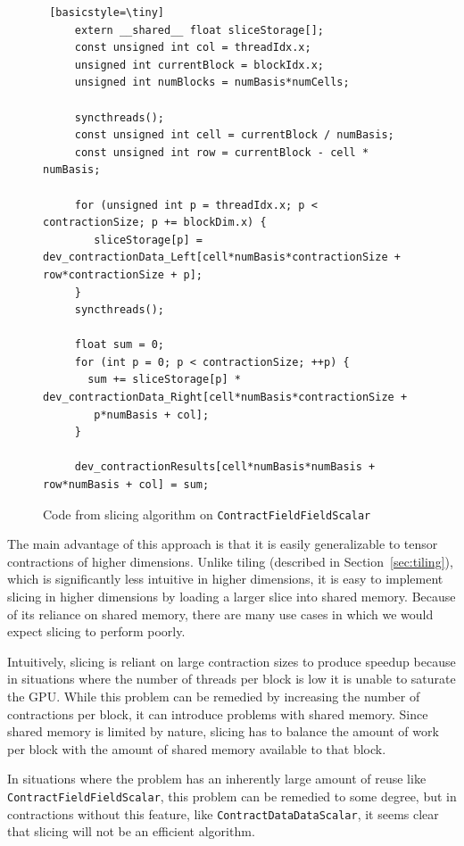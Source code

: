 \begin{figure}[ht]
    \begin{lstlisting} [basicstyle=\tiny]
     extern __shared__ float sliceStorage[];
     const unsigned int col = threadIdx.x;
     unsigned int currentBlock = blockIdx.x;
     unsigned int numBlocks = numBasis*numCells;
     
     syncthreads();
     const unsigned int cell = currentBlock / numBasis;
     const unsigned int row = currentBlock - cell * numBasis;

     for (unsigned int p = threadIdx.x; p < contractionSize; p += blockDim.x) {
        sliceStorage[p] = dev_contractionData_Left[cell*numBasis*contractionSize + row*contractionSize + p];
     }
     syncthreads();

     float sum = 0;
     for (int p = 0; p < contractionSize; ++p) {
       sum += sliceStorage[p] * dev_contractionData_Right[cell*numBasis*contractionSize +
        p*numBasis + col];
     }

     dev_contractionResults[cell*numBasis*numBasis + row*numBasis + col] = sum;
 \end{lstlisting}
\caption{Code from slicing algorithm on \texttt{ContractFieldFieldScalar}
\label{lst:ContractFieldFieldScalarSlice}} 
\end{figure}

    The main advantage of this approach is that it is easily generalizable to
tensor contractions of higher dimensions. Unlike tiling (described in Section~\ref{sec:tiling}), which is significantly
less intuitive in higher dimensions, it is easy to implement slicing in higher
dimensions by loading a larger slice into shared memory. Because of its
reliance on shared memory, there are many use cases in which we would expect
slicing to perform poorly. 

Intuitively, slicing is reliant on large contraction
sizes to produce speedup because in situations where the number of threads per
block is low it is unable to saturate the GPU. While this problem can be
remedied by increasing the number of contractions per block, it can introduce
problems with shared memory. Since shared memory is limited by nature, slicing
has to balance the amount of work per block with the amount of shared memory
available to that block.
	
    In situations where the problem has an inherently large amount of reuse
like \texttt{ContractFieldFieldScalar}, this problem can be remedied to some degree, but
in contractions without this feature, like \texttt{ContractDataDataScalar}, it seems
clear that slicing will not be an efficient algorithm. 
	
